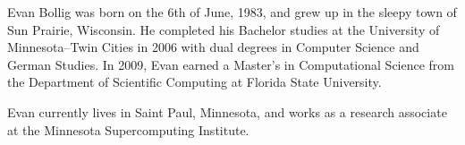 \begin{biosketch}

Evan Bollig was born on the 6th of June, 1983, and grew up in the sleepy town of Sun Prairie, Wisconsin. He completed his Bachelor studies at the University of Minnesota--Twin Cities in 2006 with dual degrees in Computer Science and German Studies. In 2009, Evan earned a Master's in Computational Science from the Department of Scientific Computing at Florida State University. 

Evan currently lives in Saint Paul, Minnesota, and works as a research associate at the Minnesota Supercomputing Institute. 


\end{biosketch}